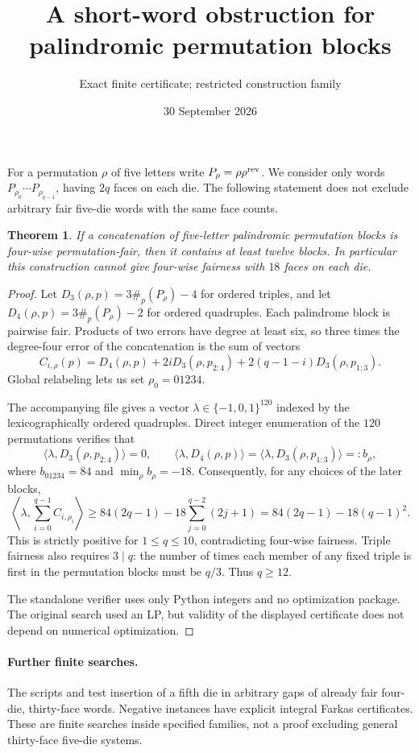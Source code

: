 \documentclass[11pt]{article}
\title{A short-word obstruction for palindromic permutation blocks}
\author{Exact finite certificate; restricted construction family}
\date{30 September 2026}
\newtheorem{theorem}{Theorem}
\begin{document}
\maketitle
For a permutation $\rho$ of five letters write $P_\rho=\rho\rho^{\rm rev}$.
We consider only words $P_{\rho_0}\cdots P_{\rho_{q-1}}$, having $2q$ faces
on each die. The following statement does not exclude arbitrary fair
five-die words with the same face counts.
\begin{theorem}
If a concatenation of five-letter palindromic permutation blocks is
four-wise permutation-fair, then it contains at least twelve blocks.
In particular this construction cannot give four-wise fairness with
$18$ faces on each die.
\end{theorem}
\begin{proof}
Let $D_3(\rho,p)=3\#_p(P_\rho)-4$ for ordered triples, and let
$D_4(\rho,p)=3\#_p(P_\rho)-2$ for ordered quadruples. Each palindrome
block is pairwise fair. Products of two errors have degree at least six,
so three times the degree-four error of the concatenation is the sum of
vectors
\[
 C_{i,\rho}(p)=D_4(\rho,p)+2iD_3(\rho,p_{2:4})
                   +2(q-1-i)D_3(\rho,p_{1:3}).
\]
Global relabeling lets us set $\rho_0=01234$.

The accompanying file 
gives a vector $\lambda\in\{-1,0,1\}^{120}$ indexed by the lexicographically
ordered quadruples. Direct integer enumeration of the $120$ permutations
verifies that
\[
 \langle\lambda,D_3(\rho,p_{2:4})\rangle=0,
 \qquad
 \langle\lambda,D_4(\rho,p)\rangle
 =\langle\lambda,D_3(\rho,p_{1:3})\rangle=:b_\rho,
\]
where $b_{01234}=84$ and $\min_\rho b_\rho=-18$.
Consequently, for any choices of the later blocks,
\[
 \left\langle\lambda,\sum_{i=0}^{q-1}C_{i,\rho_i}\right\rangle
 \ge84(2q-1)-18\sum_{j=0}^{q-2}(2j+1)
 =84(2q-1)-18(q-1)^2.
\]
This is strictly positive for $1\le q\le10$, contradicting four-wise
fairness. Triple fairness also requires $3\mid q$: the number of times
each member of any fixed triple is first in the permutation blocks must
be $q/3$. Thus $q\ge12$.

The standalone verifier 
uses only Python integers and no optimization package. The original
search used an LP, but validity of the displayed certificate does not
depend on numerical optimization.
\end{proof}
\paragraph{Further finite searches.}
The scripts  and
 test insertion of a fifth die in arbitrary
gaps of already fair four-die, thirty-face words. Negative instances
have explicit integral Farkas certificates. These are finite searches
inside specified families, not a proof excluding general thirty-face
five-die systems.
\end{document}
